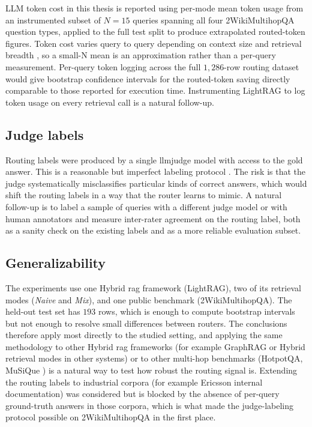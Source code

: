 \documentclass[english, bibtex]{kththesis}               %
\numberwithin{listing}{chapter}
\begin{document}
LLM token cost in this thesis is reported using per-mode mean token usage from an instrumented subset of $N=15$ queries spanning all four 2WikiMultihopQA question types, applied to the full test split to produce extrapolated routed-token figures. Token cost varies query to query depending on context size and retrieval breadth \cite{lightrag2024,microsoft2024graphragcosts}, so a small-N mean is an approximation rather than a per-query measurement. Per-query token logging across the full $1{,}286$-row routing dataset would give bootstrap confidence intervals for the routed-token saving directly comparable to those reported for execution time. Instrumenting LightRAG to log token usage on every retrieval call is a natural follow-up.

\subsection{Judge labels}
\label{sec:limitJudgeLabels}

Routing labels were produced by a single \gls{llmjudge} model with access to the gold answer. This is a reasonable but imperfect labeling protocol \cite{zheng2023judge}. The risk is that the judge systematically misclassifies particular kinds of correct answers, which would shift the routing labels in a way that the router learns to mimic. A natural follow-up is to label a sample of queries with a different judge model or with human annotators and measure inter-rater agreement on the routing label, both as a sanity check on the existing labels and as a more reliable evaluation subset.

\subsection{Generalizability}
\label{sec:limitGeneralizability}

The experiments use one Hybrid \gls{rag} framework (LightRAG), two of its retrieval modes (\emph{Naive} and \emph{Mix}), and one public benchmark (2WikiMultihopQA). The held-out test set has $193$ rows, which is enough to compute bootstrap intervals but not enough to resolve small differences between routers. The conclusions therefore apply most directly to the studied setting, and applying the same methodology to other Hybrid \gls{rag} frameworks (for example GraphRAG \cite{edge2024graphrag} or Hybrid retrieval modes in other systems) or to other multi-hop benchmarks (HotpotQA, MuSiQue \cite{yang2018hotpotqa,trivedi2022musique}) is a natural way to test how robust the routing signal is. Extending the routing labels to industrial corpora (for example Ericsson internal documentation) was considered but is blocked by the absence of per-query ground-truth answers in those corpora, which is what made the judge-labeling protocol possible on 2WikiMultihopQA in the first place.
\end{document}
